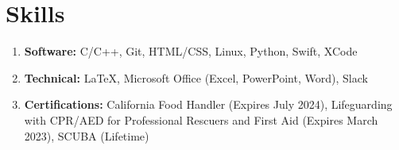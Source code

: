 \section{Skills}
\vspace{-1mm}
\begin{enumerate}[leftmargin = 0pt, topsep = 0pt, itemsep = 0.000pt, noitemsep]



\item[]\textbf{Software:} C/C++, Git, HTML/CSS, Linux, Python, Swift, XCode 
\item[]\textbf{Technical:} \LaTeX, Microsoft Office (Excel, PowerPoint, Word), Slack
\item[] \textbf{Certifications:} California Food Handler (Expires July 2024), Lifeguarding with CPR/AED for Professional Rescuers and First Aid (Expires March 2023), SCUBA (Lifetime)

\end{enumerate}
